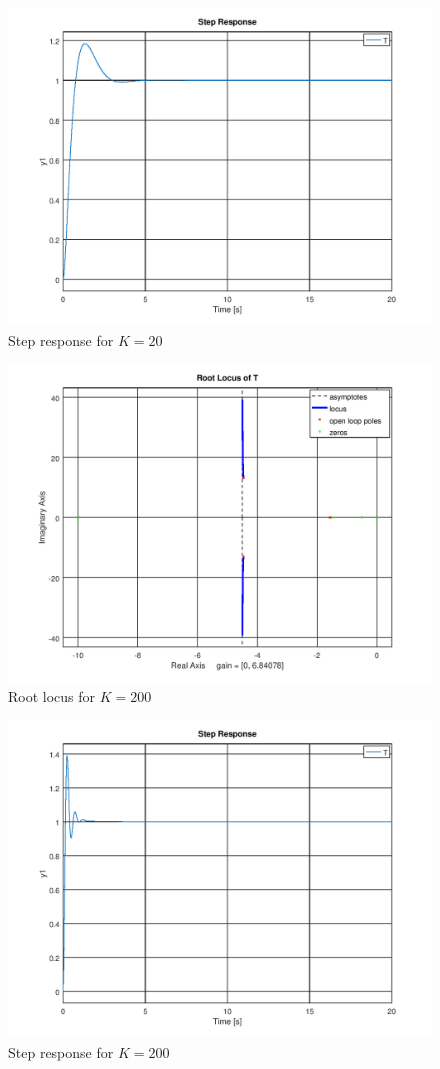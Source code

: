 \documentclass[12pt, a4paper]{article}
\begin{document}
		\begin{figure}[H]
			\centering
			\includegraphics[width=.8\textwidth]{img/step_20.png}
			\caption{Step response for $K = 20$}
			\label{fig:step_20}
		\end{figure}

		\begin{figure}[H]
			\centering
			\includegraphics[width=.8\textwidth]{img/rlocus_200.png}
			\caption{Root locus for $K = 200$}
			\label{fig:rlocus_200}
		\end{figure}

		\begin{figure}[H]
			\centering
			\includegraphics[width=.8\textwidth]{img/step_200.png}
			\caption{Step response for $K = 200$}
			\label{fig:step_200}
		\end{figure}
\end{document}
